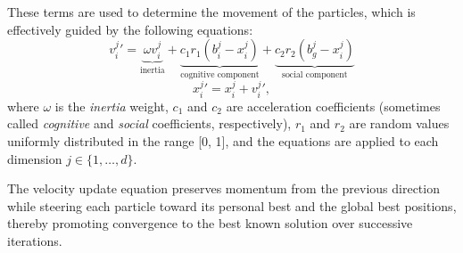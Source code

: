 {These terms are used to determine the movement of the particles, which is effectively guided by the following equations:
\begin{equation}\label{eq:velocity_update}
v_{i}^{j}{}'= \underbrace{\omega v_{i}^{j}}_{\text{inertia}} +
\underbrace{c_1 r_1 (b_{i}^{j} - x_{i}^{j})}_{\text{cognitive component}} +
\underbrace{c_2 r_2 (b_{g}^{j} - x_{i}^{j})}_{\ \ \text{social component}\ \ }
\end{equation}
\begin{equation}\label{eq:position_update}
x_{i}^{j}{}' = x_{i}^{j} + v_{i}^{j}{}',
\end{equation}
where $\omega$ is the \textit{inertia} weight, \(c_1\) and \(c_2\) are acceleration coefficients (sometimes called \textit{cognitive} and \textit{social} coefficients, respectively), \(r_1\) and \(r_2\) are random values uniformly distributed in the range [0, 1], and the equations are applied to each dimension  $j \in \{ 1,\ldots,d \}$.

The velocity update equation preserves momentum from the previous direction while steering each particle toward its personal best and the global best positions, thereby promoting convergence to the best known solution over successive iterations.

\begin{figure}[H]
    \centering
\end{figure}}
